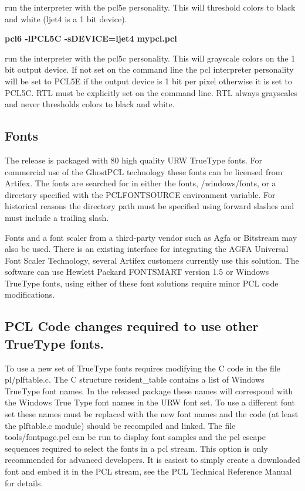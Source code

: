 \documentclass[10pt]{article}
\begin{document}
run the interpreter with the pcl5e personality. This will threshold
colors to black and white (ljet4 is a 1 bit device).

\textbf{pcl6 -lPCL5C -sDEVICE=ljet4 mypcl.pcl}

run the interpreter with the pcl5c personality. This will grayscale
colors on the 1 bit output device.  If not set on the command line the
pcl interpreter personality will be set to PCL5E if the output device
is 1 bit per pixel otherwise it is set to PCL5C. RTL must be
explicitly set on the command line. RTL always grayscales and never
thresholds colors to black and white.

\subsection*{Fonts}

The release is packaged with 80 high quality URW TrueType fonts. For
commercial use of the GhostPCL technology these fonts can be licensed
from Artifex. The fonts are searched for in either the fonts,
/windows/fonts, or a directory specified with the PCLFONTSOURCE
environment variable.  For historical reasons the directory path must
be specified using forward slashes and must include a trailing slash.

Fonts and a font scaler from a third-party vendor such as Agfa or
Bitstream may also be used. There is an existing interface for
integrating the AGFA Universal Font Scaler Technology, several Artifex
customers currently use this solution. The software can use Hewlett
Packard FONTSMART version 1.5 or Windows TrueType fonts, using either
of these font solutions require minor PCL code modifications.

\subsection*{PCL Code changes required to use other TrueType fonts.}

To use a new set of TrueType fonts requires modifying the C code in
the file pl/plftable.c. The C structure resident\_table contains a
list of Windows TrueType font names. In the released package these
names will correspond with the Windows True Type font names in the URW
font set. To use a different font set these names must be replaced
with the new font names and the code (at least the plftable.c module)
should be recompiled and linked.  The file tools/fontpage.pcl can be
run to display font samples and the pcl escape sequences required to
select the fonts in a pcl stream.  This option is only recommended for
advanced developers.  It is easiest to simply create a downloaded font
and embed it in the PCL stream, see the PCL Technical Reference
Manual~\cite{PCLTRM} for details.
\end{document}
